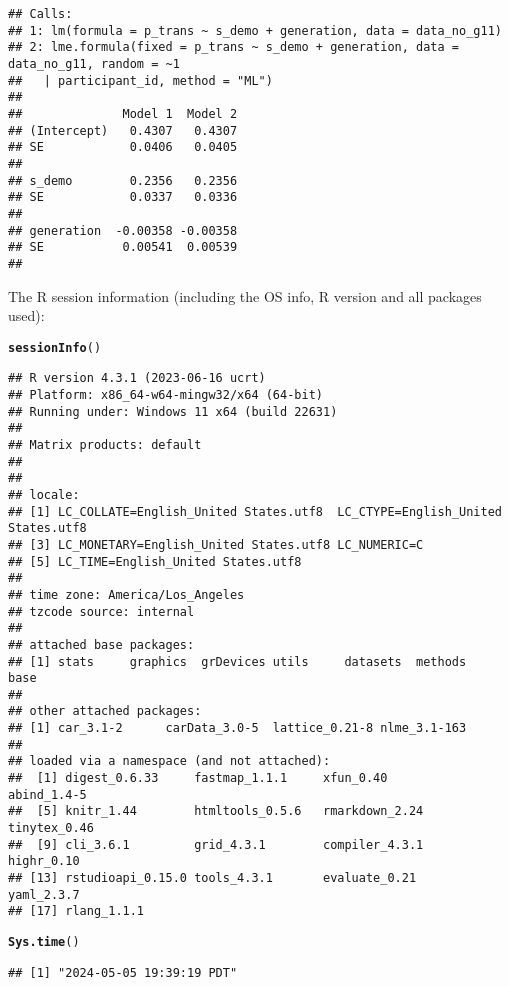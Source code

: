 \documentclass{article}\usepackage[]{graphicx}\usepackage[]{xcolor}
\makeatletter
\newcommand{\hlstd}[1]{\textcolor[rgb]{0.345,0.345,0.345}{#1}}%
\newcommand{\hlkwd}[1]{\textcolor[rgb]{0.737,0.353,0.396}{\textbf{#1}}}%
\newenvironment{kframe}{%
 \def\at@end@of@kframe{}%
 \ifinner\ifhmode%
  \def\at@end@of@kframe{\end{minipage}}%
  \begin{minipage}{\columnwidth}%
 \fi\fi%
 \def\FrameCommand##1{\hskip\@totalleftmargin \hskip-\fboxsep
 \colorbox{shadecolor}{##1}\hskip-\fboxsep
     \hskip-\linewidth \hskip-\@totalleftmargin \hskip\columnwidth}%
 \MakeFramed {\advance\hsize-\width
   \@totalleftmargin\z@ \linewidth\hsize
   \@setminipage}}%
 {\par\unskip\endMakeFramed%
 \at@end@of@kframe}
\newenvironment{knitrout}{}{} %
\makeatother
\begin{document}
\begin{knitrout}
\begin{kframe}
{\ttfamily\noindent\color{warningcolor}{\#\# Warning in compareCoefs(mod.lm2, mod.lme): models to be compared are of different classes}}\begin{verbatim}
## Calls:
## 1: lm(formula = p_trans ~ s_demo + generation, data = data_no_g11)
## 2: lme.formula(fixed = p_trans ~ s_demo + generation, data = data_no_g11, random = ~1 
##   | participant_id, method = "ML")
## 
##              Model 1  Model 2
## (Intercept)   0.4307   0.4307
## SE            0.0406   0.0405
##                              
## s_demo        0.2356   0.2356
## SE            0.0337   0.0336
##                              
## generation  -0.00358 -0.00358
## SE           0.00541  0.00539
## 
\end{verbatim}
\end{kframe}
\end{knitrout}

The R session information (including the OS info, R version and all
packages used):

\begin{knitrout}
\color{fgcolor}\begin{kframe}
\begin{alltt}
\hlkwd{sessionInfo}\hlstd{()}
\end{alltt}
\begin{verbatim}
## R version 4.3.1 (2023-06-16 ucrt)
## Platform: x86_64-w64-mingw32/x64 (64-bit)
## Running under: Windows 11 x64 (build 22631)
## 
## Matrix products: default
## 
## 
## locale:
## [1] LC_COLLATE=English_United States.utf8  LC_CTYPE=English_United States.utf8   
## [3] LC_MONETARY=English_United States.utf8 LC_NUMERIC=C                          
## [5] LC_TIME=English_United States.utf8    
## 
## time zone: America/Los_Angeles
## tzcode source: internal
## 
## attached base packages:
## [1] stats     graphics  grDevices utils     datasets  methods   base     
## 
## other attached packages:
## [1] car_3.1-2      carData_3.0-5  lattice_0.21-8 nlme_3.1-163  
## 
## loaded via a namespace (and not attached):
##  [1] digest_0.6.33     fastmap_1.1.1     xfun_0.40         abind_1.4-5      
##  [5] knitr_1.44        htmltools_0.5.6   rmarkdown_2.24    tinytex_0.46     
##  [9] cli_3.6.1         grid_4.3.1        compiler_4.3.1    highr_0.10       
## [13] rstudioapi_0.15.0 tools_4.3.1       evaluate_0.21     yaml_2.3.7       
## [17] rlang_1.1.1
\end{verbatim}
\begin{alltt}
\hlkwd{Sys.time}\hlstd{()}
\end{alltt}
\begin{verbatim}
## [1] "2024-05-05 19:39:19 PDT"
\end{verbatim}
\end{kframe}
\end{knitrout}
\end{document}
